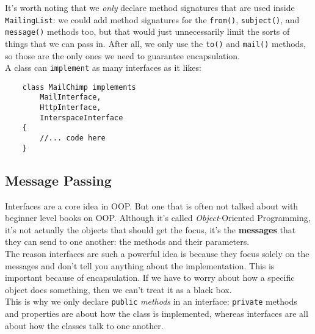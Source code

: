 It's worth noting that we \textit{only} declare method signatures that are used inside \texttt{MailingList}: we could add method signatures for the \texttt{from()}, \texttt{subject()}, and \texttt{message()} methods too, but that would just unnecessarily limit the sorts of things that we can pass in. After all, we only use the \texttt{to()} and \texttt{mail()} methods, so those are the only ones we need to guarantee encapsulation.
\\

A class can \texttt{implement} as many interfaces as it likes:

\begin{verbatim}
    class MailChimp implements
        MailInterface,
        HttpInterface,
        InterspaceInterface
    {
        //... code here
    }
\end{verbatim}


\subsection{Message Passing}

Interfaces are a core idea in OOP. But one that is often not talked about with beginner level books on OOP. Although it's called \textit{Object}-Oriented Programming, it's not actually the objects that should get the focus, it's the \textbf{messages} that they can send to one another: the methods and their parameters.
\\

The reason interfaces are such a powerful idea is because they focus solely on the messages and don't tell you anything about the implementation. This is important because of encapsulation. If we have to worry about how a specific object does something, then we can't treat it as a black box.
\\

This is why we only declare \texttt{public} \textit{methods} in an interface: \texttt{private} methods and properties are about how the class is implemented, whereas interfaces are all about how the classes talk to one another.
\\





